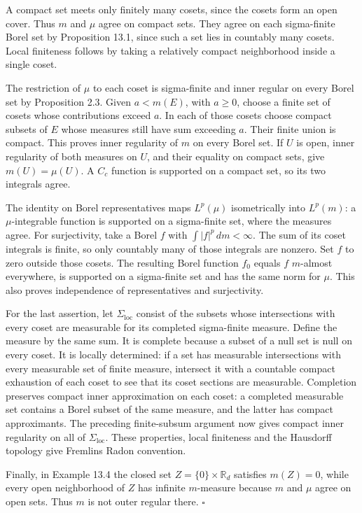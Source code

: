 \documentclass[
  english,
  11pt,
  a4paper,
]{article}
\begin{document}
A compact set meets only finitely many cosets, since the cosets form an
open cover. Thus \(m\) and \(\mu\) agree on compact sets. They agree on
each sigma-finite Borel set by Proposition 13.1, since such a set lies
in countably many cosets. Local finiteness follows by taking a
relatively compact neighborhood inside a single coset.

The restriction of \(\mu\) to each coset is sigma-finite and inner
regular on every Borel set by Proposition 2.3. Given \(a<m(E)\), with
\(a\ge0\), choose a finite set of cosets whose contributions exceed
\(a\). In each of those cosets choose compact subsets of \(E\) whose
measures still have sum exceeding \(a\). Their finite union is compact.
This proves inner regularity of \(m\) on every Borel set. If \(U\) is
open, inner regularity of both measures on \(U\), and their equality on
compact sets, give \(m(U)=\mu(U)\). A \(C_c\) function is supported on a
compact set, so its two integrals agree.

The identity on Borel representatives maps \(L^p(\mu)\) isometrically
into \(L^p(m)\): a \(\mu\)-integrable function is supported on a
sigma-finite set, where the measures agree. For surjectivity, take a
Borel \(f\) with \(\int|f|^p\,dm<\infty\). The sum of its coset
integrals is finite, so only countably many of those integrals are
nonzero. Set \(f\) to zero outside those cosets. The resulting Borel
function \(f_0\) equals \(f\) \(m\)-almost everywhere, is supported on a
sigma-finite set and has the same norm for \(\mu\). This also proves
independence of representatives and surjectivity.

For the last assertion, let \(\Sigma_{\mathrm{loc}}\) consist of the
subsets whose intersections with every coset are measurable for its
completed sigma-finite measure. Define the measure by the same sum. It
is complete because a subset of a null set is null on every coset. It is
locally determined: if a set has measurable intersections with every
measurable set of finite measure, intersect it with a countable compact
exhaustion of each coset to see that its coset sections are measurable.
Completion preserves compact inner approximation on each coset: a
completed measurable set contains a Borel subset of the same measure,
and the latter has compact approximants. The preceding finite-subsum
argument now gives compact inner regularity on all of
\(\Sigma_{\mathrm{loc}}\). These properties, local finiteness and the
Hausdorff topology give Fremlin\textquotesingle s Radon convention.

Finally, in Example 13.4 the closed set \(Z=\{0\}\times\mathbb R_d\)
satisfies \(m(Z)=0\), while every open neighborhood of \(Z\) has
infinite \(m\)-measure because \(m\) and \(\mu\) agree on open sets.
Thus \(m\) is not outer regular there. \(\square\)
\end{document}
